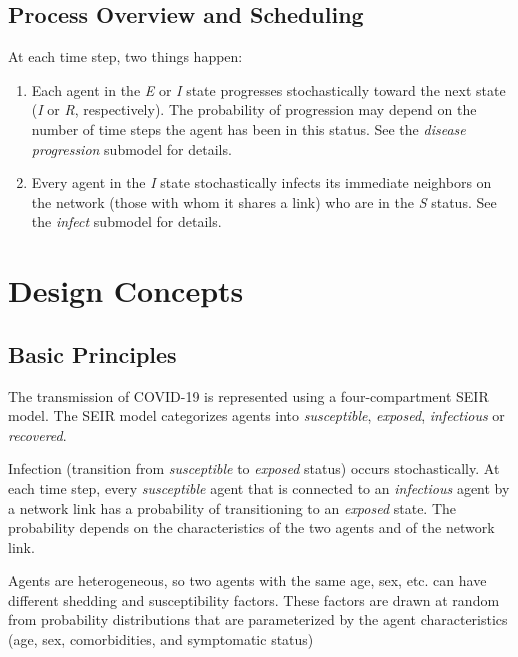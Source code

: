 \documentclass[
]{article}
\providecommand{\tightlist}{%
  \setlength{\itemsep}{0pt}\setlength{\parskip}{0pt}}
\begin{document}
\hypertarget{process-overview-and-scheduling}{%
\subsection{Process Overview and
Scheduling}\label{process-overview-and-scheduling}}

At each time step, two things happen:

\begin{enumerate}
\def\labelenumi{\arabic{enumi}.}
\tightlist
\item
  Each agent in the \emph{E} or \emph{I} state progresses stochastically
  toward the next state (\emph{I} or \emph{R}, respectively). The
  probability of progression may depend on the number of time steps the
  agent has been in this status. See the \emph{disease progression}
  submodel for details.
\item
  Every agent in the \emph{I} state stochastically infects its immediate
  neighbors on the network (those with whom it shares a link) who are in
  the \emph{S} status. See the \emph{infect} submodel for details.
\end{enumerate}

\hypertarget{design-concepts}{%
\section{Design Concepts}\label{design-concepts}}

\hypertarget{basic-principles}{%
\subsection{Basic Principles}\label{basic-principles}}

The transmission of COVID-19 is represented using a four-compartment
SEIR model. The SEIR model categorizes agents into \emph{susceptible},
\emph{exposed}, \emph{infectious} or \emph{recovered}.

Infection (transition from \emph{susceptible} to \emph{exposed} status)
occurs stochastically. At each time step, every \emph{susceptible} agent
that is connected to an \emph{infectious} agent by a network link has a
probability of transitioning to an \emph{exposed} state. The probability
depends on the characteristics of the two agents and of the network
link.

Agents are heterogeneous, so two agents with the same age, sex, etc. can
have different shedding and susceptibility factors. These factors are
drawn at random from probability distributions that are parameterized by
the agent characteristics (age, sex, comorbidities, and symptomatic
status)
\end{document}
